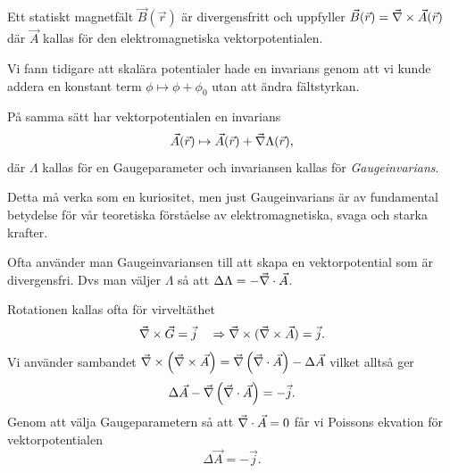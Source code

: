 \documentclass[%
oneside,                 %
final,                   %
10pt]{article}
\newenvironment{notice_mdfboxadmon}[1][]{
\begin{notice_mdfboxmdframed}[frametitle=#1]
}
{
\end{notice_mdfboxmdframed}
}
\newenvironment{warning_mdfboxadmon}[1][]{
\begin{warning_mdfboxmdframed}[frametitle=#1]
}
{
\end{warning_mdfboxmdframed}
}
\begin{document}
\begin{notice_mdfboxadmon}

Ett statiskt magnetfält $\vec{B}(\vec{r})$ är divergensfritt och uppfyller $\vec{B}(\vec{r}) = \vec{\nabla} \times \vec{A}(\vec{r})$ där $\vec{A}$ kallas för den elektromagnetiska vektorpotentialen.
\end{notice_mdfboxadmon} %



Vi fann tidigare att skalära potentialer hade en invarians genom att vi kunde addera en konstant term $\phi \mapsto \phi + \phi_0$ utan att ändra fältstyrkan.

På samma sätt har vektorpotentialen en invarians
\begin{equation}
\vec{A}(\vec{r}) \mapsto \vec{A}(\vec{r}) + \vec{\nabla} \Lambda(\vec{r}),
\end{equation}
där $\Lambda$ kallas för en Gaugeparameter och invariansen kallas för \emph{Gaugeinvarians}. 


\begin{warning_mdfboxadmon}[Kommentar]
Detta må verka som en kuriositet, men just Gaugeinvarians är av fundamental betydelse för vår teoretiska förståelse av elektromagnetiska, svaga och starka krafter.
\end{warning_mdfboxadmon} %




\begin{warning_mdfboxadmon}[Kommentar]
Ofta använder man Gaugeinvariansen till att skapa en vektorpotential som är divergensfri. Dvs man väljer $\Lambda$ så att $\Delta \Lambda = -\vec{\nabla} \cdot \vec{A}$.
\end{warning_mdfboxadmon} %



Rotationen kallas ofta för virveltäthet
$$
\vec{\nabla} \times \vec{G} = \vec{j} \quad \Rightarrow \vec{\nabla} \times (\vec{\nabla} \times \vec{A}) = \vec{j}.
$$
Vi använder sambandet $\vec{\nabla} \times \left( \vec{\nabla} \times \vec{A} \right) = \vec{\nabla} \left( \vec{\nabla} \cdot \vec{A} \right) - \Delta \vec{A}$ vilket alltså ger
$$
\Delta \vec{A} - \vec{\nabla} \left( \vec{\nabla} \cdot \vec{A} \right) = -\vec{j}.
$$
Genom att välja Gaugeparametern så att $\vec{\nabla} \cdot \vec{A} = 0$ får vi Poissons ekvation för vektorpotentialen
\begin{equation}
\Delta \vec{A} = -\vec{j}.
\end{equation}
\end{document}
